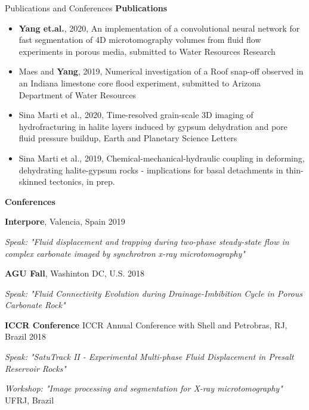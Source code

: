 \documentclass{resume} %
\newenvironment{indentpar}[1]%
  {\begin{list}{}%
          {\setlength{\leftmargin}{#1}}%
          \item[]%
  }
  {\end{list}}
\begin{document}
\begin{rSection}{Publications and Conferences}
\textbf{Publications}
\begin{indentpar}{0.5cm}
\begin{itemize}
    \item \textbf{Yang et.al.}, 2020, An implementation of a convolutional neural network for fast segmentation of 4D microtomography volumes from fluid flow experiments in porous media, submitted to Water Resources Research
    \item Maes and \textbf{Yang}, 2019, Numerical investigation of a Roof snap-off observed in an Indiana limestone core flood experiment, submitted to Arizona Department of Water Resources
    \item Sina Marti et al., 2020, 
    Time-resolved grain-scale 3D imaging of hydrofracturing in halite layers induced by gypsum dehydration and pore fluid pressure buildup, Earth and Planetary Science Letters
    \item Sina Marti et al., 2019, Chemical-mechanical-hydraulic coupling in deforming, dehydrating halite-gypsum rocks - implications for basal detachments in thin-skinned tectonics, in prep.
\end{itemize}
\end{indentpar}

\textbf{Conferences}
\begin{indentpar}{0.5cm}
\textbf{Interpore}, Valencia, Spain \hfill {2019}
\begin{indentpar}{0.5cm}
\textit {Speak: "Fluid displacement and trapping during two-phase steady-state flow in complex carbonate imaged by synchrotron x-ray microtomography"}
\end{indentpar}

\textbf{AGU Fall}, Washinton DC, U.S. \hfill {2018}
\begin{indentpar}{0.5cm}
\textit {Speak: "Fluid Connectivity Evolution during Drainage-Imbibition Cycle in Porous Carbonate Rock"}
\end{indentpar}

\textbf{ICCR Conference} ICCR Annual Conference with Shell and Petrobras, RJ, Brazil \hfill {2018}
\begin{indentpar}{0.5cm}
\textit {Speak: "SatuTrack II - Experimental Multi-phase Fluid Displacement in Presalt Reservoir Rocks"}

\textit {Workshop: "Image processing and segmentation for X-ray microtomography"} UFRJ, Brazil
\end{indentpar}


\end{indentpar}
\end{rSection}
\end{document}
